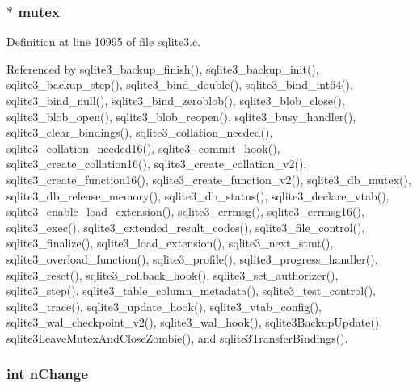 \hypertarget{structsqlite3_a7bcdded0e06fa908fe1a6df19c3dda21}{}
\subsubsection[{mutex}]{$\ast$ mutex}\label{structsqlite3_a7bcdded0e06fa908fe1a6df19c3dda21}


Definition at line 10995 of file sqlite3.\+c.



Referenced by sqlite3\+\_\+backup\+\_\+finish(), sqlite3\+\_\+backup\+\_\+init(), sqlite3\+\_\+backup\+\_\+step(), sqlite3\+\_\+bind\+\_\+double(), sqlite3\+\_\+bind\+\_\+int64(), sqlite3\+\_\+bind\+\_\+null(), sqlite3\+\_\+bind\+\_\+zeroblob(), sqlite3\+\_\+blob\+\_\+close(), sqlite3\+\_\+blob\+\_\+open(), sqlite3\+\_\+blob\+\_\+reopen(), sqlite3\+\_\+busy\+\_\+handler(), sqlite3\+\_\+clear\+\_\+bindings(), sqlite3\+\_\+collation\+\_\+needed(), sqlite3\+\_\+collation\+\_\+needed16(), sqlite3\+\_\+commit\+\_\+hook(), sqlite3\+\_\+create\+\_\+collation16(), sqlite3\+\_\+create\+\_\+collation\+\_\+v2(), sqlite3\+\_\+create\+\_\+function16(), sqlite3\+\_\+create\+\_\+function\+\_\+v2(), sqlite3\+\_\+db\+\_\+mutex(), sqlite3\+\_\+db\+\_\+release\+\_\+memory(), sqlite3\+\_\+db\+\_\+status(), sqlite3\+\_\+declare\+\_\+vtab(), sqlite3\+\_\+enable\+\_\+load\+\_\+extension(), sqlite3\+\_\+errmsg(), sqlite3\+\_\+errmsg16(), sqlite3\+\_\+exec(), sqlite3\+\_\+extended\+\_\+result\+\_\+codes(), sqlite3\+\_\+file\+\_\+control(), sqlite3\+\_\+finalize(), sqlite3\+\_\+load\+\_\+extension(), sqlite3\+\_\+next\+\_\+stmt(), sqlite3\+\_\+overload\+\_\+function(), sqlite3\+\_\+profile(), sqlite3\+\_\+progress\+\_\+handler(), sqlite3\+\_\+reset(), sqlite3\+\_\+rollback\+\_\+hook(), sqlite3\+\_\+set\+\_\+authorizer(), sqlite3\+\_\+step(), sqlite3\+\_\+table\+\_\+column\+\_\+metadata(), sqlite3\+\_\+test\+\_\+control(), sqlite3\+\_\+trace(), sqlite3\+\_\+update\+\_\+hook(), sqlite3\+\_\+vtab\+\_\+config(), sqlite3\+\_\+wal\+\_\+checkpoint\+\_\+v2(), sqlite3\+\_\+wal\+\_\+hook(), sqlite3\+Backup\+Update(), sqlite3\+Leave\+Mutex\+And\+Close\+Zombie(), and sqlite3\+Transfer\+Bindings().

\hypertarget{structsqlite3_a34a2d05071fd1eb026579e78343912a4}{}
\subsubsection[{n\+Change}]{\setlength{\rightskip}{0pt plus 5cm}int n\+Change}\label{structsqlite3_a34a2d05071fd1eb026579e78343912a4}


